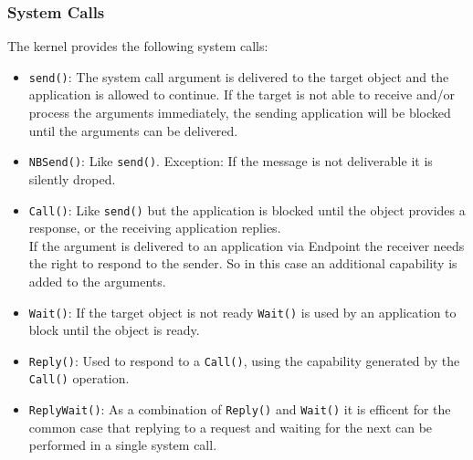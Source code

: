 \subsubsection{System Calls}
The kernel provides the following system calls:
\begin{itemize}
\item \texttt{send()}: The system call argument is delivered to the target object and the application is allowed to continue. If the target is not able to receive and/or process the arguments immediately, the sending application will be blocked until the arguments can be delivered.

\item \texttt{NBSend()}: Like \texttt{send()}. Exception: If the message is not deliverable it is silently droped.
\item \texttt{Call()}: Like \texttt{send()} but the application is blocked until the object provides a response, or the receiving application replies. \\
If the argument is delivered to an application via Endpoint the receiver needs the right to respond to the sender. So in this case an additional capability is added to the arguments. 
\item \texttt{Wait()}: If the target object is not ready \texttt{Wait()} is used by an application to block until the object is ready. 
\item \texttt{Reply()}: Used to respond to a \texttt{Call()}, using the capability generated by the \texttt{Call()} operation.
\item \texttt{ReplyWait()}: As a combination of \texttt{Reply()} and \texttt{Wait()} it is efficent for the common case that replying to a request and waiting for the next can be performed in a single system call. 
\end{itemize}
	
